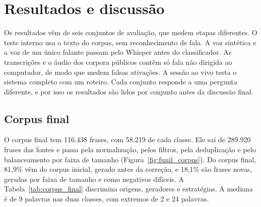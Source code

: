 \documentclass[
    12pt,                %
    openright,           %
    oneside,             %
    a4paper,             %
    english,             %
    brazil               %
]{abntex2}
\begin{document}

\chapter{Resultados e discussão}
\label{cap:resultados}

Os resultados vêm de seis conjuntos de avaliação, que medem etapas diferentes. O teste interno usa o texto do corpus, sem reconhecimento de fala. A voz sintética e a voz de um único falante passam pelo Whisper antes do classificador. As transcrições e o áudio dos corpora públicos contêm só fala não dirigida ao computador, de modo que medem falsas ativações. A sessão ao vivo testa o sistema completo com um roteiro. Cada conjunto responde a uma pergunta diferente, e por isso os resultados são lidos por conjunto antes da discussão final.


\section{Corpus final}
\label{sec:res_corpus}

O corpus final tem 116.438 frases, com 58.219 de cada classe. Ele sai de 289.920 frases das fontes e passa pela normalização, pelos filtros, pela deduplicação e pelo balanceamento por faixa de tamanho (Figura~\ref{fig:funil_corpus}). Do corpus final, 81,9\% vêm do corpus inicial, gerado antes da correção, e 18,1\% são frases novas, geradas por faixa de tamanho e como negativos difíceis. A Tabela~\ref{tab:corpus_final} discrimina origens, geradores e estratégias. A mediana é de 9 palavras nas duas classes, com extremos de 2 e 24 palavras.
\end{document}
